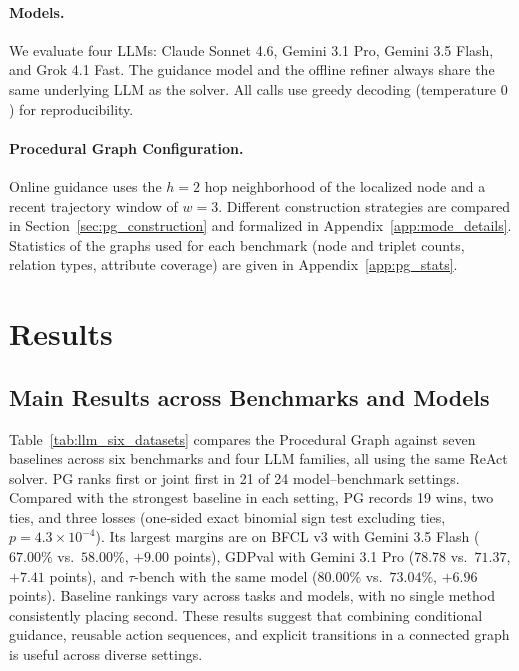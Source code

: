 \paragraph{Models.} We evaluate four LLMs: Claude Sonnet 4.6, Gemini 3.1 Pro, Gemini 3.5 Flash, and Grok 4.1 Fast. The guidance model and the offline refiner always share the same underlying LLM as the solver. All calls use greedy decoding (temperature $0$) for reproducibility.

\paragraph{Procedural Graph Configuration.} Online guidance uses the $h{=}2$ hop neighborhood of the localized node and a recent trajectory window of $w{=}3$. Different construction strategies are compared in Section~\ref{sec:pg_construction} and formalized in Appendix~\ref{app:mode_details}. Statistics of the graphs used for each benchmark (node and triplet counts, relation types, attribute coverage) are given in Appendix~\ref{app:pg_stats}.

\section{Results}

\subsection{Main Results across Benchmarks and Models}

Table~\ref{tab:llm_six_datasets} compares the Procedural Graph against seven baselines across six benchmarks and four LLM families, all using the same ReAct solver. PG ranks first or joint first in 21 of 24 model--benchmark settings. Compared with the strongest baseline in each setting, PG records 19 wins, two ties, and three losses (one-sided exact binomial sign test excluding ties, $p = 4.3\times10^{-4}$). Its largest margins are on BFCL v3 with Gemini 3.5 Flash ($67.00\%$ vs.\ $58.00\%$, $+9.00$ points), GDPval with Gemini 3.1 Pro ($78.78$ vs.\ $71.37$, $+7.41$ points), and $\tau$-bench with the same model ($80.00\%$ vs.\ $73.04\%$, $+6.96$ points). Baseline rankings vary across tasks and models, with no single method consistently placing second. These results suggest that combining conditional guidance, reusable action sequences, and explicit transitions in a connected graph is useful across diverse settings.

